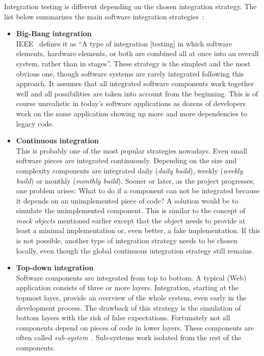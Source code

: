 \documentclass[12pt, notitlepage]{article}
\begin{document}
Integration testing is different depending on the chosen integration strategy. The list below summarizes the main software integration strategies~\cite{schattenbest}:\\
\begin{itemize}
	\item \textbf{Big-Bang integration}\\
	IEEE~\cite{ieee-definition} defines it as \enquote{A type of integration [testing] in which software elements, hardware elements, or both are combined all at once into an overall system, rather than in stages}. These strategy is the simplest and the most obvious one, though software systems are rarely integrated following this approach. It assumes that all integrated software components work together well and all possibilities are taken into account from the beginning. This is of course
unrealistic in today's software applications as dozens of developers work on the same application showing up more and more dependencies to legacy code. 
	\item \textbf{Continuous integration}\\
	This is probably one of the most popular strategies nowadays. Even small software pieces are integrated continuously. Depending on the 
	size and complexity components are integrated daily (\textit{daily build}), weekly (\textit{weekly build}) or monthly (\textit{monthly build}). 
	Sooner or later, as the project progresses, one problem arises: What to do if a component can not be integrated because it depends on an unimplemented 
	piece of code? A solution would be to simulate the unimplemented component. This is similar to the concept of \textit{mock objects} mentioned earlier 
	except that the object needs to provide at least a minimal implementation or, even better, a fake implementation. If this is not possible, another type of integration 
	strategy needs to be chosen locally, even though the global continuous integration strategy still remains. 
\item \textbf{Top-down integration}\\
	Software components are integrated from top to bottom. A typical (Web) application consists of three or more layers. Integration, starting at the topmost layer,
	provide an overview of the whole system, even early in the development process. The drawback of this strategy is the simulation of bottom layers with the risk
	of false expectations. Fortunately not all components depend on pieces of code in lower layers. These components are often called
	\textit{sub-system}~\cite{sw-testing-quality-assurance}. Sub-systems work isolated from the rest of the components. 

\end{itemize}
\end{document}

